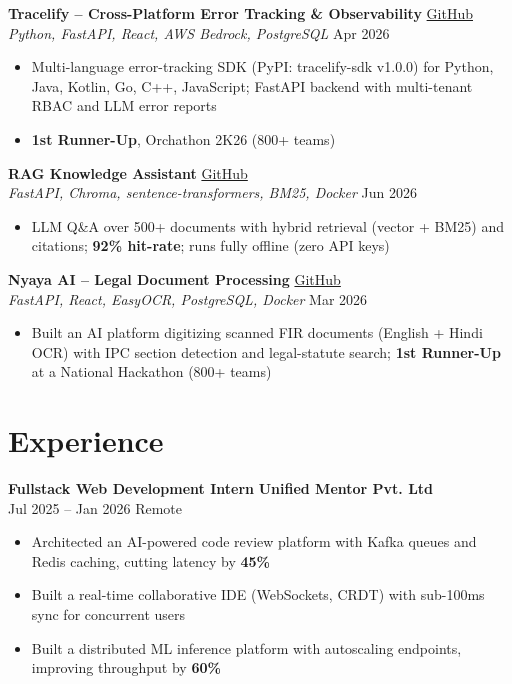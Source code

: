 \documentclass[9pt, letterpaper]{article}
\begin{document}
\textbf{Tracelify -- Cross-Platform Error Tracking \& Observability} \hfill \small{\href{https://github.com/adityashirsatrao007/error-tracking-observability-sdk}{GitHub}} \normalsize\\
\textit{Python, FastAPI, React, AWS Bedrock, PostgreSQL} \hfill Apr 2026
\begin{itemize}
  \item Multi-language error-tracking SDK (PyPI: tracelify-sdk v1.0.0) for Python, Java, Kotlin, Go, C++, JavaScript; FastAPI backend with multi-tenant RBAC and LLM error reports
  \item \textbf{1st Runner-Up}, Orchathon 2K26 (800+ teams)
\end{itemize}

\textbf{RAG Knowledge Assistant} \hfill \small{\href{https://github.com/adityashirsatrao007/rag-knowledge-assistant}{GitHub}} \normalsize\\
\textit{FastAPI, Chroma, sentence-transformers, BM25, Docker} \hfill Jun 2026
\begin{itemize}
  \item LLM Q\&A over 500+ documents with hybrid retrieval (vector + BM25) and citations; \textbf{92\% hit-rate}; runs fully offline (zero API keys)
\end{itemize}

\textbf{Nyaya AI -- Legal Document Processing} \hfill \small{\href{https://github.com/adityashirsatrao007/fir-digitization-legal-ai}{GitHub}} \normalsize\\
\textit{FastAPI, React, EasyOCR, PostgreSQL, Docker} \hfill Mar 2026
\begin{itemize}
  \item Built an AI platform digitizing scanned FIR documents (English + Hindi OCR) with IPC section detection and legal-statute search; \textbf{1st Runner-Up} at a National Hackathon (800+ teams)
\end{itemize}

\section{Experience}

\textbf{Fullstack Web Development Intern} \hfill \textbf{Unified Mentor Pvt. Ltd}\\
Jul 2025 -- Jan 2026 \hfill Remote
\begin{itemize}
  \item Architected an AI-powered code review platform with Kafka queues and Redis caching, cutting latency by \textbf{45\%}
  \item Built a real-time collaborative IDE (WebSockets, CRDT) with sub-100ms sync for concurrent users
  \item Built a distributed ML inference platform with autoscaling endpoints, improving throughput by \textbf{60\%}
\end{itemize}
\end{document}
